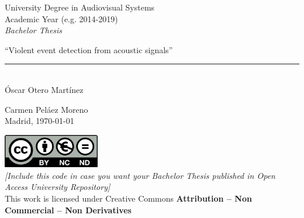 \documentclass[12pt]{report} %
\begin{document}
	
\begin{titlepage}
	\begin{sffamily}
	\color{azulUC3M}
	\begin{center}
		\begin{figure}[H] %
		\end{figure}
		\vspace{2.5cm}
		\begin{Large}
			University Degree in Audiovisual Systems\\			
			Academic Year (e.g. 2014-2019)\\
			\vspace{2cm}		
			\textsl{Bachelor Thesis}
			\bigskip
			
		\end{Large}
		 	{\Huge ``Violent event detection from acoustic signals''}\\
		 	\vspace*{0.5cm}
	 		\rule{10.5cm}{0.1mm}\\
			\vspace*{0.9cm}
			{\LARGE Óscar Otero Martínez}\\ 
			\vspace*{1cm}
		\begin{Large}
			Carmen Peláez Moreno\\
			Madrid, {\today}\\
		\end{Large}
	\end{center}
	\vfill
	\color{black}
	\includegraphics[width=4.2cm]{imagenes/creativecommons.png}\\  %
	\emph{[Include this code in case you want your Bachelor Thesis published in Open Access University Repository]}\\ %
	This work is licensed under Creative Commons \textbf{Attribution – Non Commercial – Non Derivatives}
	\end{sffamily}
\end{titlepage}
\end{document}
